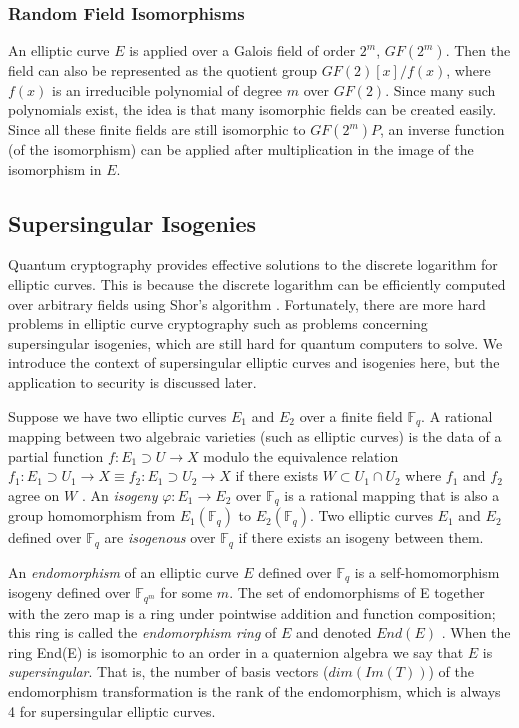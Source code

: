 \documentclass{article}
\begin{document}
\subsubsection{Random Field Isomorphisms}
    An elliptic curve $E$ is applied over a Galois field of order $2^m$,
    $GF(2^m)$. Then the field can also be represented as the quotient group
    $GF(2)[x]/f(x)$, where $f(x)$ is an irreducible polynomial of degree $m$
    over $GF(2)$. Since many such polynomials exist, the idea is that many
    isomorphic fields can be created easily. Since all these finite fields are
    still isomorphic to $GF(2^m)P$, an inverse function (of the isomorphism)
    can be applied after multiplication in the image of the isomorphism in $E$.

\subsection{Supersingular Isogenies}
    Quantum cryptography provides effective solutions to the discrete logarithm
    for elliptic curves. This is because the discrete logarithm can be
    efficiently computed over arbitrary fields using Shor's algorithm
    \cite{shor}.  Fortunately, there are more hard problems in elliptic curve
    cryptography such as problems concerning supersingular isogenies, which are
    still hard for quantum computers to solve. We introduce the context of
    supersingular elliptic curves and isogenies here, but the application to
    security is discussed later.

    Suppose we have two elliptic curves $E_1$ and $E_2$ over a finite field
    $\mathbb{F}_q$. A rational mapping between two algebraic varieties (such as
    elliptic curves) is the data of a partial function
    $f: E_1 \supset U \rightarrow X$ modulo the equivalence relation
    $f_1: E_1 \supset U_1 \rightarrow X \equiv
    f_2: E_1 \supset U_2 \rightarrow X$ if there exists $W \subset U_1 \cap U_2$
    where $f_1$ and $f_2$ agree on $W$ \cite{class13}. An \textit{isogeny}
    $\varphi: E_1 \rightarrow E_2$ over $\mathbb{F}_q$
    is a rational mapping that is also a group homomorphism from
    $E_1 (\mathbb{F}_q)$ to $E_2 (\mathbb{F}_q)$. Two elliptic curves
    $E_1$ and $E_2$ defined over $\mathbb{F}_q$ are \textit{isogenous} over
    $\mathbb{F}_q$ if there exists an isogeny between them.

    An \textit{endomorphism} of an elliptic curve $E$ defined over
    $\mathbb{F}_q$ is a self-homomorphism isogeny defined over
    $\mathbb{F}_{q^m}$ for some $m$. The set of endomorphisms of E together
    with the zero map is a ring under pointwise addition and function
    composition; this ring is called the \textit{endomorphism ring} of $E$ and
    denoted $End(E)$ \cite{jao2011towards}.  When the ring End(E) is isomorphic
    to an order in a quaternion algebra we say that $E$ is
    \textit{supersingular}. That is, the number of basis vectors ($dim(Im(T))$)
    of the endomorphism transformation is the rank of the endomorphism, which
    is always 4 for supersingular elliptic curves.
\end{document}
